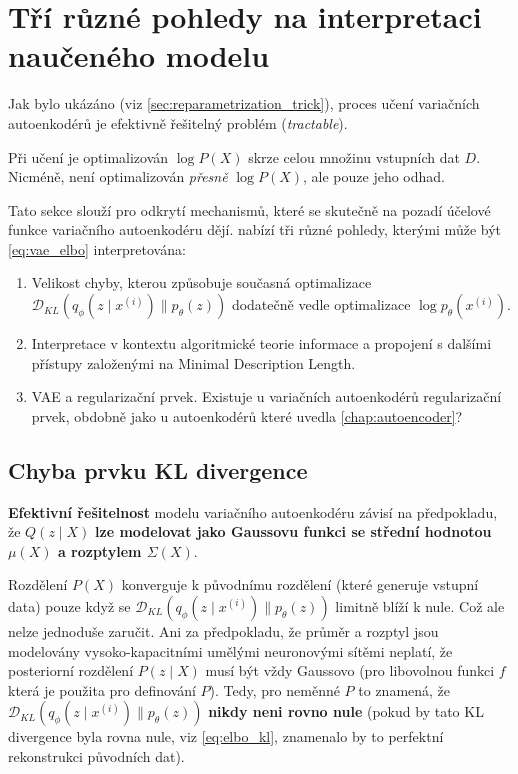 \section{Tří různé pohledy na interpretaci naučeného modelu}
Jak bylo ukázáno (viz \autoref{sec:reparametrization_trick}), proces učení variačních autoenkodérů je efektivně řešitelný problém (\emph{tractable}).

Při učení je optimalizován $\log P(X)$ skrze celou množinu vstupních dat $D$. Nicméně, není optimalizován \emph{přesně} $\log P(X)$, ale pouze jeho odhad.

Tato sekce slouží pro odkrytí mechanismů, které se skutečně na pozadí účelové funkce variačního autoenkodéru dějí.
\textcite{Doersch2021} nabízí tři různé pohledy, kterými může být \autoref{eq:vae_elbo} interpretována:
\begin{enumerate}
    \item Velikost chyby, kterou způsobuje současná optimalizace $\mathcal{D}_{KL}(q_\phi(z\mid x^{(i)})\parallel p_\theta(z))$ dodatečně vedle optimalizace $\log p_\theta(x^{(i)})$.
    \item Interpretace v kontextu algoritmické teorie informace a propojení s dalšími přístupy založenými na Minimal Description Length.
    \item VAE a regularizační prvek. Existuje u variačních autoenkodérů regularizační prvek, obdobně jako u  autoenkodérů které uvedla \autoref{chap:autoencoder}?
\end{enumerate}

\subsection{Chyba prvku KL divergence}
\textbf{Efektivní řešitelnost} modelu variačního autoenkodéru závisí na předpokladu,
že $Q(z\mid X)$ \textbf{lze modelovat jako Gaussovu funkci se střední hodnotou $\mu(X)$ a rozptylem $\Sigma(X)$}. \cite{Doersch2021}

Rozdělení $P(X)$ konverguje k původnímu rozdělení (které generuje vstupní data) pouze když se $\mathcal{D}_{KL}(q_\phi(z\mid x^{(i)})\parallel p_\theta(z))$ limitně blíží k nule.
Což ale nelze jednoduše zaručit. Ani za předpokladu, že průměr a rozptyl jsou modelovány vysoko-kapacitními umělými neuronovými sítěmi neplatí, že posteriorní rozdělení $P(z\mid X)$ musí být vždy Gaussovo (pro libovolnou funkci $f$ která je použita pro definování $P$).
Tedy, pro neměnné $P$ to znamená, že $\mathcal{D}_{KL}(q_\phi(z\mid x^{(i)})\parallel p_\theta(z))$ \textbf{nikdy neni rovno nule} (pokud by tato KL divergence byla rovna nule, viz \autoref{eq:elbo_kl}, znamenalo by to perfektní rekonstrukci původních dat). \cite{Doersch2021}

